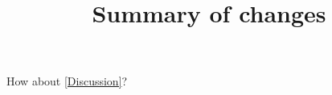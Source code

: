 \documentclass{article}
\title{Summary of changes}
\date\relax
\begin{document}
\maketitle

How about \cref{Discussion}?
\end{document}
